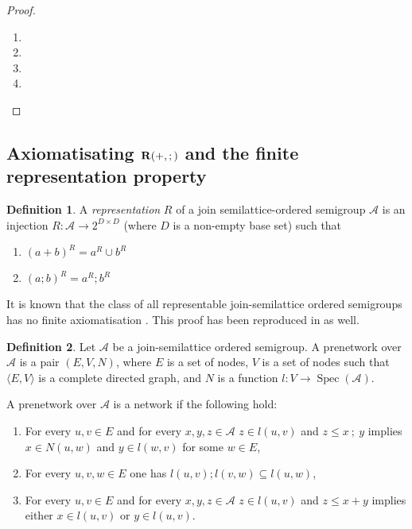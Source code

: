 \documentclass[a4paper]{article}
\theoremstyle{definition}
\newtheorem{definition}{Definition}
\theoremstyle{theorem}
\theoremstyle{proposition}
\theoremstyle{lemma}
\theoremstyle{ex}
\theoremstyle{corollary}
\theoremstyle{claim}
\begin{document}
\begin{proof}
$ $

  \begin{enumerate}
    \item
    \item
    \item
    \item
  \end{enumerate}
\end{proof}

\subsection{Axiomatisating ${\bf R}(+, ;)$ and the finite representation property}

\begin{definition}
  A \emph{representation} $R$ of a join semilattice-ordered semigroup $\mathcal{A}$
  is an injection $R : \mathcal{A} \to 2^{D \times D}$ (where $D$ is a non-empty base set) such that
  \begin{enumerate}
    \item $(a + b)^R = a^R \cup b^R$
    \item $(a ; b)^R = a^R ; b^R$
  \end{enumerate}
\end{definition}

It is known that the class of all representable join-semilattice ordered semigroups has no finite axiomatisation \cite{andreka1989union}. This proof has been reproduced in \cite{andreka2011axiomatizability} as well.

\begin{definition} Let $\mathcal{A}$ be a join-semilattice ordered semigroup. A prenetwork over $\mathcal{A}$ is a pair $(E, V, N)$, where $E$ is a set of nodes, $V$ is a set of nodes such that $\langle E, V \rangle$ is a complete directed graph, and $N$ is a function $l : V \to \operatorname{Spec}(\mathcal{A})$.

  A prenetwork over $\mathcal{A}$ is a network if the following hold:
  \begin{enumerate}
    \item For every $u, v \in E$ and for every $x,y,z \in \mathcal{A}$ $z \in l(u, v)$ and $z \leq x \: ; \: y$ implies $x \in N(u, w)$ and $y \in l(w, v)$ for some $w \in E$,
    \item For every $u, v, w \in E$ one has $l(u, v) ; l(v, w) \subseteq l(u, w)$,
    \item For every $u, v \in E$ and for every $x,y,z \in \mathcal{A}$ $z \in l(u, v)$ and $z \leq x + y$ implies either $x \in l(u, v)$ or $y \in l(u, v)$.
  \end{enumerate}
\end{definition}
\end{document}
